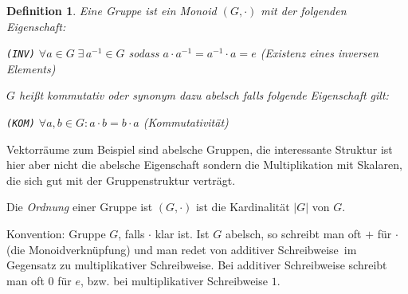 \documentclass[10pt,a4paper]{article}
\newtheorem{defi}{Definition}
\begin{document}
\begin{defi} Eine \emph{Gruppe} ist ein Monoid $(G, \cdot)$ mit der folgenden Eigenschaft: 

\begin{center}
\emph{\texttt{(INV)}} $\forall a \in G\; \exists\, a^{-1} \in G$ sodass $a \cdot a^{-1} = a^{-1} \cdot a = e$ (Existenz eines inversen Elements)
\end{center}
$G$ heißt \emph{kommutativ} oder synonym dazu \emph{abelsch} falls folgende Eigenschaft gilt:
\begin{center}
\emph{\texttt{(KOM)}} $\forall a, b \in G: a \cdot b = b \cdot a$ (Kommutativität)
\end{center}
\end{defi}

Vektorräume zum Beispiel sind abelsche Gruppen, die interessante Struktur ist hier aber nicht die abelsche Eigenschaft sondern die Multiplikation mit Skalaren, die sich gut mit der Gruppenstruktur verträgt.\bigskip


Die \emph{Ordnung} einer Gruppe ist $(G, \cdot)$ ist die Kardinalität $\vert G \vert$ von $G$.\bigskip

Konvention: \glqq Gruppe $G$\grqq , falls $\cdot$ klar ist. Ist $G$ abelsch, so schreibt man oft $+$ für $\cdot$ (die Monoidverknüpfung) und man redet von \glqq additiver Schreibweise\grqq\ im Gegensatz zu \glqq multiplikativer Schreibweise\grqq . Bei additiver Schreibweise schreibt man oft $0$ für $e$, bzw. bei multiplikativer Schreibweise $1$.\bigskip
\end{document}
